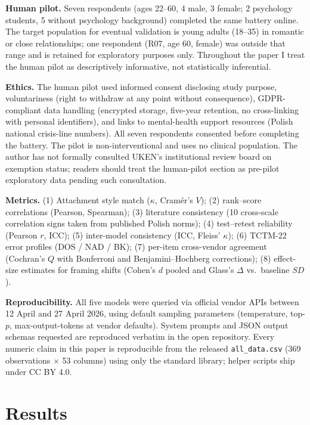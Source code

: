 \documentclass[11pt,a4paper]{article}
\begin{document}
\textbf{Human pilot.} Seven respondents (ages 22--60, 4 male, 3 female; 2 psychology students, 5 without psychology background) completed the same battery online. The target population for eventual validation is young adults (18--35) in romantic or close relationships; one respondent (R07, age 60, female) was outside that range and is retained for exploratory purposes only. Throughout the paper I treat the human pilot as descriptively informative, not statistically inferential.

\textbf{Ethics.} The human pilot used informed consent disclosing study purpose, voluntariness (right to withdraw at any point without consequence), GDPR-compliant data handling (encrypted storage, five-year retention, no cross-linking with personal identifiers), and links to mental-health support resources (Polish national crisis-line numbers). All seven respondents consented before completing the battery. The pilot is non-interventional and uses no clinical population. The author has not formally consulted UKEN's institutional review board on exemption status; readers should treat the human-pilot section as pre-pilot exploratory data pending such consultation.

\textbf{Metrics.} (1) Attachment style match ($\kappa$, Cram\'er's $V$); (2) rank--score correlations (Pearson, Spearman); (3) literature consistency (10 cross-scale correlation signs taken from published Polish norms); (4) test--retest reliability (Pearson $r$, ICC); (5) inter-model consistency (ICC, Fleiss' $\kappa$); (6) TCTM-22 error profiles (DOS / NAD / BK); (7) per-item cross-vendor agreement (Cochran's $Q$ with Bonferroni and Benjamini--Hochberg corrections); (8) effect-size estimates for framing shifts (Cohen's $d$ pooled and Glass's $\Delta$ vs.\ baseline $SD$).

\textbf{Reproducibility.} All five models were queried via official vendor APIs between 12 April and 27 April 2026, using default sampling parameters (temperature, top-$p$, max-output-tokens at vendor defaults). System prompts and JSON output schemas requested are reproduced verbatim in the open repository. Every numeric claim in this paper is reproducible from the released \texttt{all\_data.csv} (369 observations $\times$ 53 columns) using only the standard library; helper scripts ship under CC BY 4.0.

\section{Results}
\end{document}
